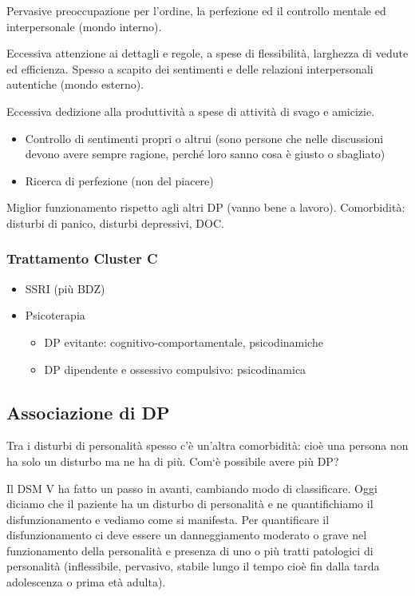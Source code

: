 Pervasive preoccupazione per l'ordine, la perfezione ed il controllo
mentale ed interpersonale (mondo interno).

Eccessiva attenzione ai dettagli e regole, a spese di flessibilità,
larghezza di vedute ed efficienza. Spesso a scapito dei sentimenti e
delle relazioni interpersonali autentiche (mondo esterno).

Eccessiva dedizione alla produttività a spese di attività di svago e
amicizie.

\begin{itemize}
\item
  Controllo di sentimenti propri o altrui (sono persone che nelle
  discussioni devono avere sempre ragione, perché loro sanno cosa è
  giusto o sbagliato)
\item
  Ricerca di perfezione (non del piacere)
\end{itemize}

Miglior funzionamento rispetto agli altri DP (vanno bene a lavoro).
Comorbidità: disturbi di panico, disturbi depressivi, DOC.

\subsubsection{Trattamento Cluster C}

\begin{itemize}
\item
  SSRI (più BDZ)
\item
  Psicoterapia
\begin{itemize}
\item
  DP evitante: cognitivo-comportamentale, psicodinamiche
\item
  DP dipendente e ossessivo compulsivo: psicodinamica
\end{itemize}
\end{itemize}

\subsection{Associazione di DP}

Tra i disturbi di personalità spesso c'è un'altra comorbidità: cioè una
persona non ha solo un disturbo ma ne ha di più. Com`è possibile avere
più DP?

Il DSM V ha fatto un passo in avanti, cambiando modo di classificare.
Oggi diciamo che il paziente ha un disturbo di personalità e ne
quantifichiamo il disfunzionamento e vediamo come si manifesta. Per
quantificare il disfunzionamento ci deve essere un danneggiamento
moderato o grave nel funzionamento della personalità e presenza di uno o
più tratti patologici di personalità (inflessibile, pervasivo, stabile
lungo il tempo cioè fin dalla tarda adolescenza o prima età adulta).
